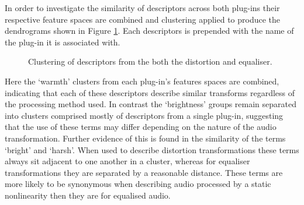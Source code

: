 		In order to investigate the similarity of descriptors across both plug-ins their respective feature spaces
		are combined and clustering applied to produce the dendrograms shown in Figure \ref{fig:CombinedClusters}.
		Each descriptors is prepended with the name of the plug-in it is associated with.

		\begin{figure}[h!]
			\centering
			\qquad
			\caption{Clustering of descriptors from the both the distortion and equaliser.}
			\label{fig:CombinedClusters}
		\end{figure}

		Here the `warmth' clusters from each plug-in's features spaces are combined, indicating that each of these
		descriptors describe similar transforms regardless of the processing method used. In contrast the
		`brightness' groups remain separated into clusters comprised mostly of descriptors from a single plug-in,
		suggesting that the use of these terms may differ depending on the nature of the audio transformation.
		Further evidence of this is found in the similarity of the terms `bright' and `harsh'. When used to describe
		distortion transformations these terms always sit adjacent to one another in a cluster, whereas for
		equaliser transformations they are separated by a reasonable distance. These terms are more likely to be
		synonymous when describing audio processed by a static nonlinearity then they are for equalised audio.

